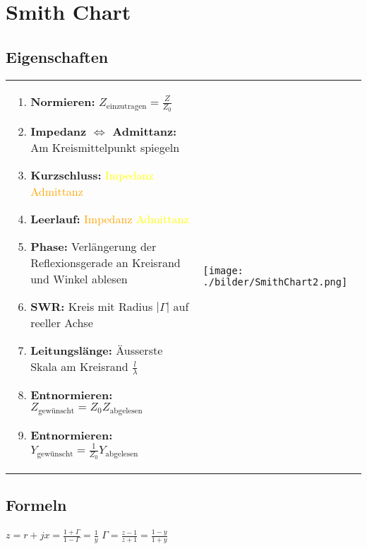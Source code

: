 
\section{Smith Chart}
\subsection{Eigenschaften}
	\begin{tabular}{p{10cm}p{8cm}}
		\begin{minipage}{10cm}
        	\begin{enumerate}{\setlength{\itemsep}{0cm}\setlength{\parsep}{0cm} \setlength{\topsep}{0cm}}
              \item \textbf{Normieren:} $Z_{\text{einzutragen}} = \frac{Z}{Z_0}$
              \item \textbf{Impedanz $\Leftrightarrow$ Admittanz:} Am Kreismittelpunkt spiegeln
              \item \textbf{Kurzschluss:} 	\textcolor{yellow}{Impedanz} \textcolor{orange}{Admittanz}
              \item \textbf{Leerlauf:}		\textcolor{orange}{Impedanz} \textcolor{yellow}{Admittanz}
        	  \item \textbf{Phase:}	Verlängerung der Reflexionsgerade an Kreisrand und Winkel ablesen
        	  \item \textbf{SWR:} Kreis mit Radius $|\Gamma|$ auf reeller Achse
        	  \item \textbf{Leitungslänge:} Äusserste Skala am Kreisrand  $\frac{l}{\lambda}$
        	  \item \textbf{Entnormieren:} $Z_{\text{gewünscht}} = Z_0
        	  Z_{\text{abgelesen}}$
        	  \item \textbf{Entnormieren:} $Y_{\text{gewünscht}} = \frac{1}{Z_0}
        	  Y_{\text{abgelesen}}$
            \end{enumerate}
            
        \end{minipage} &
		\begin{minipage}{8cm}
        	\texttt{[image: ./bilder/SmithChart2.png]}
        \end{minipage}
	\end{tabular}
\subsection{Formeln}
	$z=r+jx=\frac{1+\Gamma}{1-\Gamma}=\frac{1}{y}$ \qquad
	$\Gamma=\frac{z-1}{z+1}=\frac{1-y}{1+y}$
	
